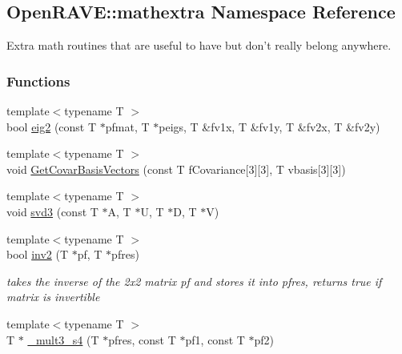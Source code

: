\hypertarget{namespaceOpenRAVE_1_1mathextra}{
\subsection{OpenRAVE::mathextra Namespace Reference}
\label{namespaceOpenRAVE_1_1mathextra}
}


Extra math routines that are useful to have but don't really belong anywhere.  


\subsubsection*{Functions}
\begin{DoxyCompactItemize}
\item 
{\footnotesize template$<$typename T $>$ }\\bool \hyperlink{namespaceOpenRAVE_1_1mathextra_a3c6e92adb2deae09d195c86818918c4b}{eig2} (const T $\ast$pfmat, T $\ast$peigs, T \&fv1x, T \&fv1y, T \&fv2x, T \&fv2y)
\item 
{\footnotesize template$<$typename T $>$ }\\void \hyperlink{namespaceOpenRAVE_1_1mathextra_ac7b910595448278e861ce787a01fc9a2}{GetCovarBasisVectors} (const T fCovariance\mbox{[}3\mbox{]}\mbox{[}3\mbox{]}, T vbasis\mbox{[}3\mbox{]}\mbox{[}3\mbox{]})
\item 
{\footnotesize template$<$typename T $>$ }\\void \hyperlink{namespaceOpenRAVE_1_1mathextra_a698af188ade25c457317354c0e9ebcba}{svd3} (const T $\ast$A, T $\ast$U, T $\ast$D, T $\ast$V)
\item 
\hypertarget{namespaceOpenRAVE_1_1mathextra_abb67a10be5fe708132dbe3792089cb43}{
{\footnotesize template$<$typename T $>$ }\\bool \hyperlink{namespaceOpenRAVE_1_1mathextra_abb67a10be5fe708132dbe3792089cb43}{inv2} (T $\ast$pf, T $\ast$pfres)}
\label{namespaceOpenRAVE_1_1mathextra_abb67a10be5fe708132dbe3792089cb43}

\begin{DoxyCompactList}\small\item\em takes the inverse of the 2x2 matrix pf and stores it into pfres, returns true if matrix is invertible \item\end{DoxyCompactList}\item 
\hypertarget{namespaceOpenRAVE_1_1mathextra_acdad3d8acab4d752d7373d9cb5a0a9db}{
{\footnotesize template$<$typename T $>$ }\\T $\ast$ \hyperlink{namespaceOpenRAVE_1_1mathextra_acdad3d8acab4d752d7373d9cb5a0a9db}{\_\-mult3\_\-s4} (T $\ast$pfres, const T $\ast$pf1, const T $\ast$pf2)}
\label{namespaceOpenRAVE_1_1mathextra_acdad3d8acab4d752d7373d9cb5a0a9db}


\end{DoxyCompactItemize}
